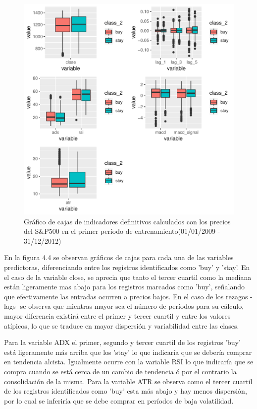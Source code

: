 \documentclass[a4paper,12pt]{Latex/Classes/PhDthesisPSnPDF}
\begin{document}
\begin{figure}[H]
\centering
\includegraphics{main-009}
\caption{Gráfico de cajas de indicadores definitivos calculados con los precios del S\&P500 en el primer período de entrenamiento(01/01/2009 - 31/12/2012)}
\end{figure}

En la figura 4.4 se observan gráficos de cajas para cada una de las variables predictoras, diferenciando entre los registros identificados como 'buy' y 'stay'. En el caso de la variable close, se aprecia que tanto el tercer cuartil como la mediana están ligeramente mas abajo para los registros marcados como 'buy', señalando que efectivamente las entradas ocurren a precios bajos. En el caso de los rezagos -lags- se observa que mientras mayor sea el número de períodos para su cálculo, mayor diferencia existirá entre el primer y tercer cuartil y entre los valores atípicos, lo que se traduce en mayor dispersión y variabilidad entre las clases.

Para la variable ADX el primer, segundo y tercer cuartil de los registros 'buy' está ligeramente más arriba que los 'stay' lo que indicaría que se debería comprar en tendencia alcista. Igualmente ocurre con la variable RSI lo que indicaría que se compra cuando se está cerca de un cambio de tendencia ó por el contrario la consolidación de la misma. Para la variable ATR se observa como el tercer cuartil de los registros identificados como 'buy' esta más abajo y hay menos dispersión, por lo cual se inferiría que se debe comprar en períodos de baja volatilidad.
\end{document}
